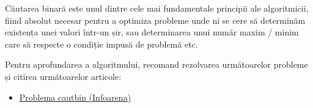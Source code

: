 Căutarea binară este unul dintre cele mai fundamentale principii ale algoritmicii, fiind absolut necesar pentru a optimiza probleme unde ni se cere să determinăm existența unei valori într-un șir, sau determinarea unui număr maxim / minim care să respecte o condiție impusă de problemă etc.

Pentru aprofundarea a algoritmului, recomand rezolvarea următoarelor probleme și citirea următoarelor articole:

\begin{itemize}
    \item \href{https://www.infoarena.ro/problema/cautbin}{Problema cautbin (Infoarena)}
\end{itemize}
